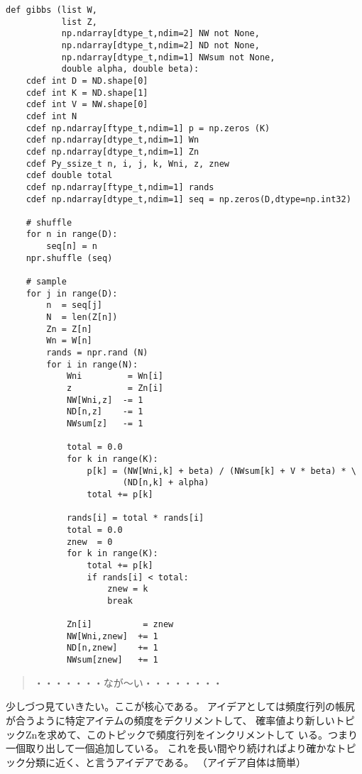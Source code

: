 \documentclass[uplatex]{jsarticle}
\begin{document}
\begin{lstlisting}
def gibbs (list W,
           list Z,
           np.ndarray[dtype_t,ndim=2] NW not None,
           np.ndarray[dtype_t,ndim=2] ND not None,
           np.ndarray[dtype_t,ndim=1] NWsum not None,
           double alpha, double beta):
    cdef int D = ND.shape[0]
    cdef int K = ND.shape[1]
    cdef int V = NW.shape[0]
    cdef int N
    cdef np.ndarray[ftype_t,ndim=1] p = np.zeros (K)
    cdef np.ndarray[dtype_t,ndim=1] Wn
    cdef np.ndarray[dtype_t,ndim=1] Zn
    cdef Py_ssize_t n, i, j, k, Wni, z, znew
    cdef double total
    cdef np.ndarray[ftype_t,ndim=1] rands
    cdef np.ndarray[dtype_t,ndim=1] seq = np.zeros(D,dtype=np.int32)

    # shuffle
    for n in range(D):
        seq[n] = n
    npr.shuffle (seq)
    
    # sample
    for j in range(D):
        n  = seq[j]
        N  = len(Z[n])
        Zn = Z[n]
        Wn = W[n]
        rands = npr.rand (N)
        for i in range(N):
            Wni         = Wn[i]
            z           = Zn[i]
            NW[Wni,z]  -= 1
            ND[n,z]    -= 1
            NWsum[z]   -= 1

            total = 0.0
            for k in range(K):
                p[k] = (NW[Wni,k] + beta) / (NWsum[k] + V * beta) * \
                       (ND[n,k] + alpha)
                total += p[k]
            
            rands[i] = total * rands[i]
            total = 0.0
            znew  = 0
            for k in range(K):
                total += p[k]
                if rands[i] < total:
                    znew = k
                    break

            Zn[i]          = znew
            NW[Wni,znew]  += 1
            ND[n,znew]    += 1
            NWsum[znew]   += 1

\end{lstlisting}

\begin{quote}
\Large ・・・・・・・なが〜い・・・・・・・・
\end{quote}

少しづつ見ていきたい。ここが核心である。
アイデアとしては頻度行列の帳尻が合うように特定アイテムの頻度をデクリメントして、
確率値より新しいトピックZnを求めて、このトピックで頻度行列をインクリメントして
いる。つまり一個取り出して一個追加している。
これを長い間やり続ければより確かなトピック分類に近く、と言うアイデアである。
（アイデア自体は簡単）
\end{document}
